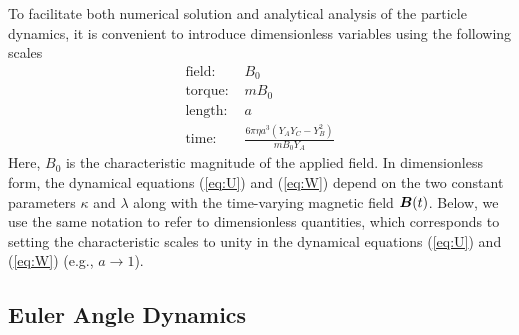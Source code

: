 To facilitate both numerical solution and analytical analysis of the particle dynamics, it is convenient to introduce dimensionless variables using the following scales
\begin{align}
    \text{field:  } & B_0
    \\
    \text{torque:  } &  mB_0
    \\
    \text{length:  } & a
    \\
    \text{time:  } & \frac{6\pi \eta a^3 (Y_A Y_C-Y_B^2)}{m B_0 Y_A}  
\end{align}
Here, $B_0$ is the characteristic magnitude of the applied field. In dimensionless form, the dynamical equations (\ref{eq:U}) and (\ref{eq:W}) depend on the  two constant parameters $\kappa$ and $\lambda$ along with the time-varying magnetic field $\boldsymbol{B}(t)$. Below, we use the same notation to refer to dimensionless quantities, which corresponds to setting the characteristic scales to unity in the dynamical equations (\ref{eq:U}) and (\ref{eq:W}) (e.g., $a\rightarrow 1$).

\subsection{Euler Angle Dynamics}

